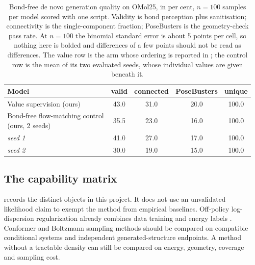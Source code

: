 \begin{table}[h]
\caption{Bond-free de novo generation quality on OMol25, in per cent, $n = 100$ samples
per model scored with one script. Validity is bond perception plus sanitisation;
connectivity is the single-component fraction; PoseBusters is the geometry-check pass
rate. At $n = 100$ the binomial standard error is about 5 points per cell, so nothing
here is bolded and differences of a few points should not be read as differences. The
value row is the arm whose ordering is reported in ; the control row
is the mean of its two evaluated seeds, whose individual values are given beneath it.}
\label{tab:generation}
\begin{center}
\small
\begin{tabular}{lcccc}
\toprule
Model & valid & connected & PoseBusters & unique \\
\midrule
Value supervision (ours)                & 43.0 & 31.0 & 20.0 & 100.0 \\
Bond-free flow-matching control (ours, 2 seeds) & 35.5 & 23.0 & 16.0 & 100.0 \\
\quad \emph{seed 1} & 41.0 & 27.0 & 17.0 & 100.0 \\
\quad \emph{seed 2} & 30.0 & 19.0 & 15.0 & 100.0 \\
\bottomrule
\end{tabular}
\end{center}
\end{table}

\subsection{The capability matrix}
\label{app:capability}

 records the distinct objects in this project. It does not
use an unvalidated likelihood claim to exempt the method from empirical baselines.
Off-policy log-dispersion regularization already combines data training and energy
labels \citep{ldr2026}. Conformer and Boltzmann sampling methods should be compared
on compatible conditional systems and independent generated-structure endpoints.
A method without a tractable density can still be compared on energy, geometry,
coverage and sampling cost.

